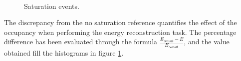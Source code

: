 \begin{figure}
	\centering
	 \\
	\caption{Saturation events.}
	\label{fig:perc_sat}
\end{figure}



The discrepancy from the no saturation reference quantifies the effect of the occupancy when performing the energy reconstruction task. The percentage difference has been evaluated through the formula $\frac{E_{NoSat}-E}{E_{NoSat}}$, and the value obtained fill the histograms in figure \ref{fig:perc_sat}.\\

